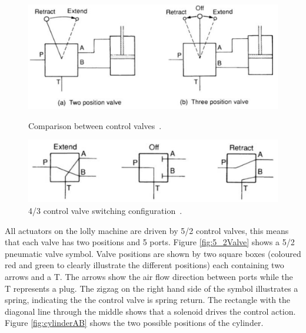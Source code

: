     \begin{figure}[H]
    \centering
    \begin{minipage}{0.45\textwidth}
        \centering
        \includegraphics[width = 1\textwidth]{2_images/controlValves.png}
        \caption{Comparison between control valves~\cite{parr2011hydraulics}.}
        \label{fig:controlValves}
    \end{minipage}\hfill
    \begin{minipage}{0.5\textwidth}
        \centering
        \includegraphics[width = 1\textwidth]{2_images/controlValveConfig.png}
        \caption{4/3 control valve switching configuration~\cite{parr2011hydraulics}.}
        \label{fig:controlValveConfig}
    \end{minipage}\hfill            
    \end{figure}      
    

    All actuators on the lolly machine are driven by 5/2 control valves, this means that each valve has two positions and 5 ports. Figure \ref{fig:5_2Valve} shows a 5/2 pneumatic valve symbol. Valve positions are shown by two square boxes (coloured red and green to clearly illustrate the different positions) each containing two arrows and a T. The arrows show the air flow direction between ports while the T represents a plug. The zigzag on the right hand side of the symbol illustrates a spring, indicating the the control valve is spring return. The rectangle with the diagonal line through the middle shows that a solenoid drives the control action. Figure \ref{fig:cylinderAB} shows the two possible positions of the cylinder.

